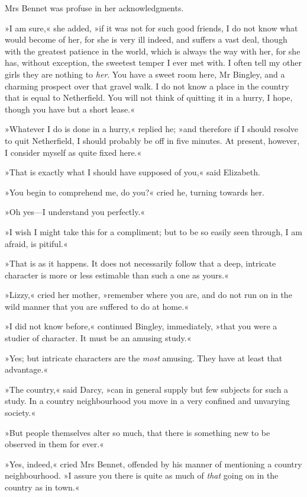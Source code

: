 Mrs Bennet was profuse in her acknowledgments.

»I am sure,« she added, »if it was not for such good friends, I do not know what would become of her, for she is very ill indeed, and suffers a vast deal, though with the greatest patience in the world, which is always the way with her, for she has, without exception, the sweetest temper I ever met with. I often tell my other girls they are nothing to \textit{her}. You have a sweet room here, Mr Bingley, and a charming prospect over that gravel walk. I do not know a place in the country that is equal to Netherfield. You will not think of quitting it in a hurry, I hope, though you have but a short lease.«

»Whatever I do is done in a hurry,« replied he; »and therefore if I should resolve to quit Netherfield, I should probably be off in five minutes. At present, however, I consider myself as quite fixed here.«

»That is exactly what I should have supposed of you,« said Elizabeth.

»You begin to comprehend me, do you?« cried he, turning towards her.

»Oh yes—I understand you perfectly.«

»I wish I might take this for a compliment; but to be so easily seen through, I am afraid, is pitiful.«

»That is as it happens. It does not necessarily follow that a deep, intricate character is more or less estimable than such a one as yours.«

»Lizzy,« cried her mother, »remember where you are, and do not run on in the wild manner that you are suffered to do at home.«

»I did not know before,« continued Bingley, immediately, »that you were a studier of character. It must be an amusing study.«

»Yes; but intricate characters are the \textit{most} amusing. They have at least that advantage.«

»The country,« said Darcy, »can in general supply but few subjects for such a study. In a country neighbourhood you move in a very confined and unvarying society.«

»But people themselves alter so much, that there is something new to be observed in them for ever.«

»Yes, indeed,« cried Mrs Bennet, offended by his manner of mentioning a country neighbourhood. »I assure you there is quite as much of \textit{that} going on in the country as in town.«

